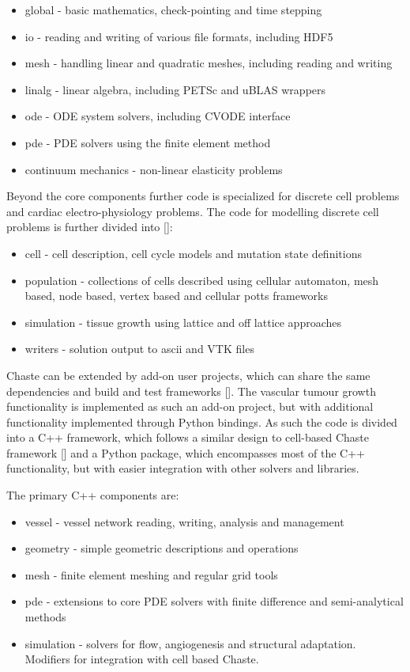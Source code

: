 \documentclass[superscriptaddress, a4paper]{article}
\begin{document}
\begin{itemize}
 \item global - basic mathematics, check-pointing and time stepping
 \item io - reading and writing of various file formats, including HDF5
 \item mesh - handling linear and quadratic meshes, including reading and writing
 \item linalg - linear algebra, including PETSc and uBLAS wrappers
 \item ode - ODE system solvers, including CVODE interface
 \item pde - PDE solvers using the finite element method
 \item continuum mechanics - non-linear elasticity problems
\end{itemize}

Beyond the core components further code is specialized for discrete cell problems and cardiac electro-physiology problems. The code for modelling discrete cell problems is further divided into []:

\begin{itemize}
 \item cell - cell description, cell cycle models and mutation state definitions
 \item population - collections of cells described using cellular automaton, mesh based, node based, vertex based and cellular potts frameworks
 \item simulation - tissue growth using lattice and off lattice approaches
 \item writers - solution output to ascii and VTK files
\end{itemize}

Chaste can be extended by add-on user projects, which can share the same dependencies and build and test frameworks []. The vascular tumour growth functionality is implemented as such an add-on project, but with additional functionality implemented through Python bindings. As such the code is divided into a C++ framework, which follows a similar design to cell-based Chaste framework [] and a Python package, which encompasses most of the C++ functionality, but with easier integration with other solvers and libraries. 

The primary C++ components are:

\begin{itemize}
 \item vessel - vessel network reading, writing, analysis and management
 \item geometry - simple geometric descriptions and operations
 \item mesh - finite element meshing and regular grid tools
 \item pde - extensions to core PDE solvers with finite difference and semi-analytical methods
 \item simulation - solvers for flow, angiogenesis and structural adaptation. Modifiers for integration with cell based Chaste.
\end{itemize}
\end{document}
